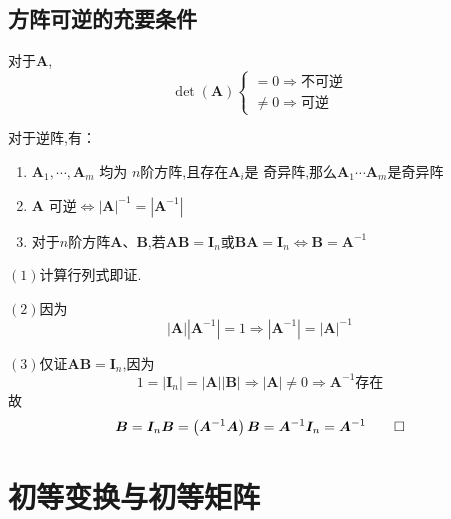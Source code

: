 \subsection{方阵可逆的充要条件}
\begin{formal}
    \begin{theorem}[矩阵可逆的充要条件]
对于$\bm{A}$,
    \begin{equation*}
         \det\left(\bm{A}\right)
        \begin{cases*}
            = 0 \Longrightarrow\text{不可逆}\\
            \neq 0 \Longrightarrow \text{可逆}
        \end{cases*}
    \end{equation*}
\end{theorem}
\end{formal}
\begin{green}
\begin{corollary}[逆阵的若干推论]\label{cor:逆阵的若干推论}对于逆阵,有：

    \begin{enumerate}[label=\textup{(\arabic*)}]
        \item $\bm{A}_1,\cdots,\bm{A}_m$
            均为
        $n$阶方阵,且存在$\bm{A}_i$是
        奇异阵,那么$\bm{A}_1
        \cdots \bm{A}_m$是奇异阵
        \item $ \bm{A}$
        可逆$\Longleftrightarrow 
        \left|\bm{A}\right|^{-1} = \left|
            \bm{A}^{-1}
        \right|$
        \item 对于$n$阶方阵$
        \bm{A}$、$\bm{B}$,若$
        \bm{AB}=\bm{I}_n$或$
        \bm{BA}=\bm{I}_n\Longleftrightarrow 
        \bm{B} = \bm{A}^{-1}$
    \end{enumerate}
\end{corollary}
\begin{Proof}
$(1)$计算行列式即证.

$(2)$因为
\[
\big|\bm{A}\big|\left|\bm{A}^{-1}\right|=1 
\Longrightarrow \left| \bm{A}^{-1}\right|=
\big | \bm{A}\big|^{-1}
\]

$(3)$仅证$\bm{AB}=\bm{I}_n$,因为
\[
1=\left|\bm{I}_n\right|=\left|\bm{A}\right|\left|\bm{B}\right|
\Longrightarrow \left|\bm{A}\right|\neq 0 \Longrightarrow \bm{A}^{-1}\text{存在}
\]
故
\[
\bm{B}=\bm{I}_n\bm{B}=\left(\bm{A}^{-1}\bm{A}\right)\bm{B}=\bm{A}^{-1}\bm{I}_n=\bm{A}^{-1}\qedhere
\]
\end{Proof}
\end{green}
\newpage
\section{初等变换与初等矩阵}
